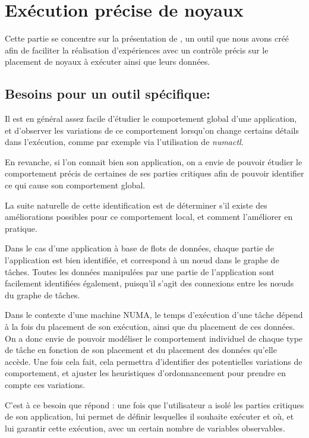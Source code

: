 \section{Exécution précise de noyaux}\label{sec:contribs:outil}

Cette partie se concentre sur la présentation de \outil, un outil que nous avons créé afin de faciliter la réalisation d'expériences avec un contrôle précis sur le placement de noyaux à exécuter ainsi que leurs données.

\subsection{Besoins pour un outil spécifique: \outil}

Il est en général assez facile d'étudier le comportement global d'une application, et d'observer les variations de ce comportement lorsqu'on change certains détails dans l'exécution, comme par exemple via l'utilisation de \emph{numactl}.

En revanche, si l'on connait bien son application, on a envie de pouvoir étudier le comportement précis de certaines de ses parties critiques afin de pouvoir identifier ce qui cause son comportement global.

La suite naturelle de cette identification est de déterminer s'il existe des améliorations possibles pour ce comportement local, et comment l'améliorer en pratique.

Dans le cas d'une application à base de flots de données, chaque partie de l'application est bien identifiée, et correspond à un nœud dans le graphe de tâches.
Toutes les données manipulées par une partie de l'application sont facilement identifiées également, puisqu'il s'agit des connexions entre les nœuds du graphe de tâches.

Dans le contexte d'une machine NUMA, le temps d'exécution d'une tâche dépend à la fois du placement de son exécution, ainsi que du placement de ces données. On a donc envie de pouvoir modéliser le comportement individuel de chaque type de tâche en fonction de son placement et du placement des données qu'elle accède.
Une fois cela fait, cela permettra d'identifier des potentielles variations de comportement, et ajuster les heuristiques d'ordonnancement pour prendre en compte ces variations.

C'est à ce besoin que répond \outil : une fois que l'utilisateur a isolé les parties critiques de son application, \outil lui permet de définir lesquelles il souhaite exécuter et où, et lui garantir cette exécution, avec un certain nombre de variables observables.

